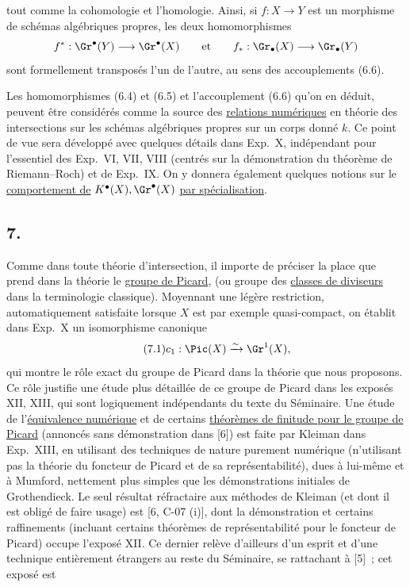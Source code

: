 tout comme la cohomologie et l'homologie. Ainsi, si $f:X\to Y$ est un morphisme de sch\'emas alg\'ebriques propres, les deux homomorphismes
\[
f^*:\Gr^\bullet(Y)\longrightarrow \Gr^\bullet(X)\qquad\text{et}\qquad f_*:\Gr_\bullet(X)\longrightarrow \Gr_\bullet(Y)
\]
sont formellement transpos\'es l'un de l'autre, au sens des accouplements (6.6).

Les homomorphismes (6.4) et (6.5) et l'accouplement (6.6) qu'on en d\'eduit, peuvent \^etre consid\'er\'es comme la source des \uline{relations num\'eriques} en th\'eorie des intersections sur les sch\'emas alg\'ebriques propres sur un corps donn\'e $k$. Ce point de vue sera d\'evelopp\'e avec quelques d\'etails dans Exp.\ X, ind\'ependant pour l'essentiel des Exp.\ VI, VII, VIII (centr\'es sur la d\'emonstration du th\'eor\`eme de Riemann--Roch) et de Exp.\ IX. On y donnera \'egalement quelques notions sur le \uline{comportement de} $K^\bullet(X),\Gr^\bullet(X)$ \uline{par sp\'ecialisation}.

\subsection*{7.}
Comme dans toute th\'eorie d'intersection, il importe de pr\'eciser la place que prend dans la th\'eorie le \uline{groupe de Picard}, (ou groupe des \uline{classes de diviseurs} dans la terminologie classique). Moyennant une l\'eg\`ere restriction, automatiquement satisfaite lorsque $X$ est par exemple quasi-compact, on \'etablit dans Exp.\ X un isomorphisme canonique
\begin{equation}\tag{7.1}
c_1:\Pic(X)\xrightarrow{\sim}\Gr^1(X),
\end{equation}
qui montre le r\^ole exact du groupe de Picard dans la th\'eorie que nous proposons. Ce r\^ole justifie une \'etude plus d\'etaill\'ee de ce groupe de Picard dans les expos\'es XII, XIII, qui sont logiquement ind\'ependants du texte du S\'eminaire. Une \'etude de l'\uline{\'equivalence num\'erique} et de certains \uline{th\'eor\`emes de finitude pour le groupe de Picard} (annonc\'es sans d\'emonstration dans [6]) est faite par Kleiman dans Exp.\ XIII, en utilisant des techniques de nature purement num\'erique (n'utilisant pas la th\'eorie du foncteur de Picard et de sa repr\'esentabilit\'e), dues \`a lui-m\^eme et \`a Mumford, nettement plus simples que les d\'emonstrations initiales de Grothendieck. Le seul r\'esultat r\'efractaire aux m\'ethodes de Kleiman (et dont il est oblig\'e de faire usage) est [6, C-07 (i)], dont la d\'emonstration et certains raffinements (incluant certains th\'eor\`emes de repr\'esentabilit\'e pour le foncteur de Picard) occupe l'expos\'e XII. Ce dernier rel\`eve d'ailleurs d'un esprit et d'une technique enti\`erement \'etrangers au reste du S\'eminaire, se rattachant \`a [5]~; cet expos\'e est
